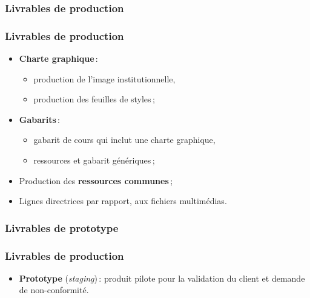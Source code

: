 					\subsubsection{Livrables de production} 
							\begin{frame}
							\frametitle{Livrables de production}
                        			
							\begin{itemize}
							\item \textbf{Charte graphique}\,:
								\begin{itemize}
								\item production de l’image institutionnelle,
								\item production des feuilles de styles\,;
								\end{itemize}
							\item \textbf{Gabarits}\,:
								\begin{itemize}
								\item gabarit de cours qui inclut une charte graphique,
								\item ressources et gabarit génériques\,;
								\end{itemize}
							\item Production des \textbf{ressources communes}\,;
							\item Lignes directrices par rapport, aux fichiers multimédias.
						
							\end{itemize}						
					\end{frame}
					
						\subsubsection{Livrables de prototype} 
							\begin{frame}
							\frametitle{Livrables de production}
                        			
							\begin{itemize}
							\item \textbf{Prototype} (\textit{staging})\,: produit pilote pour la validation du client et demande de non-conformité.
						
							\end{itemize}						
					\end{frame}
					
